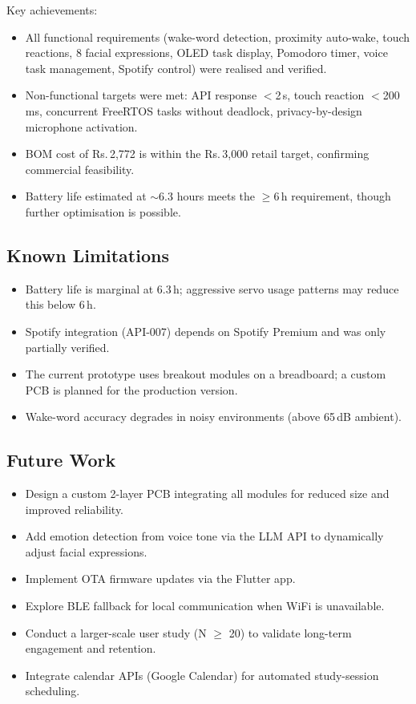 \documentclass[12pt,a4paper]{article}
\begin{document}
Key achievements:
\begin{itemize}[leftmargin=*]
\item All functional requirements (wake-word detection, proximity
      auto-wake, touch reactions, 8 facial expressions, OLED task
      display, Pomodoro timer, voice task management, Spotify control)
      were realised and verified.
\item Non-functional targets were met: API response $<$2\,s, touch
      reaction $<$200\,ms, concurrent FreeRTOS tasks without deadlock,
      privacy-by-design microphone activation.
\item BOM cost of Rs.\,2{,}772 is within the Rs.\,3{,}000 retail
      target, confirming commercial feasibility.
\item Battery life estimated at $\sim$6.3 hours meets the $\geq$6\,h
      requirement, though further optimisation is possible.
\end{itemize}

\subsection{Known Limitations}

\begin{itemize}[leftmargin=*]
\item Battery life is marginal at 6.3\,h; aggressive servo usage
      patterns may reduce this below 6\,h.
\item Spotify integration (API-007) depends on Spotify Premium and
      was only partially verified.
\item The current prototype uses breakout modules on a breadboard;
      a custom PCB is planned for the production version.
\item Wake-word accuracy degrades in noisy environments (above
      65\,dB ambient).
\end{itemize}

\subsection{Future Work}

\begin{itemize}[leftmargin=*]
\item Design a custom 2-layer PCB integrating all modules for reduced
      size and improved reliability.
\item Add emotion detection from voice tone via the LLM API to
      dynamically adjust facial expressions.
\item Implement OTA firmware updates via the Flutter app.
\item Explore BLE fallback for local communication when WiFi is
      unavailable.
\item Conduct a larger-scale user study (N $\geq$ 20) to validate
      long-term engagement and retention.
\item Integrate calendar APIs (Google Calendar) for automated
      study-session scheduling.
\end{itemize}
\end{document}
